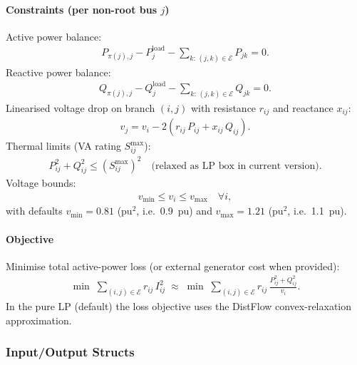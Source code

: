 \paragraph{Constraints (per non-root bus $j$)}
Active power balance:
\begin{align}
P_{\pi(j),j} - P_{j}^{\mathrm{load}} - \sum_{k:\,(j,k)\in\mathcal{E}} P_{jk} = 0.
\end{align}
Reactive power balance:
\begin{align}
Q_{\pi(j),j} - Q_{j}^{\mathrm{load}} - \sum_{k:\,(j,k)\in\mathcal{E}} Q_{jk} = 0.
\end{align}
Linearised voltage drop on branch $(i,j)$ with resistance $r_{ij}$ and
reactance $x_{ij}$:
\begin{align}
v_j = v_i - 2(r_{ij}\,P_{ij} + x_{ij}\,Q_{ij}).
\end{align}
Thermal limits (VA rating $S_{ij}^{\max}$):
\begin{align}
P_{ij}^2 + Q_{ij}^2 \le (S_{ij}^{\max})^2 \quad \text{(relaxed as LP box in
current version)}.
\end{align}
Voltage bounds:
\begin{align}
v_{\min} \le v_i \le v_{\max}\quad \forall i,
\end{align}
with defaults $v_{\min}=0.81$ (pu$^2$, i.e.\ 0.9~pu) and
$v_{\max}=1.21$ (pu$^2$, i.e.\ 1.1~pu).

\paragraph{Objective}
Minimise total active-power loss (or external generator cost when provided):
\begin{align}
\min\;\sum_{(i,j)\in\mathcal{E}} r_{ij}\,I_{ij}^2
\;\approx\;
\min\;\sum_{(i,j)\in\mathcal{E}} r_{ij}\,\frac{P_{ij}^2+Q_{ij}^2}{v_i}.
\end{align}
In the pure LP (default) the loss objective uses the DistFlow convex-relaxation
approximation.

\subsubsection{Input/Output Structs}

